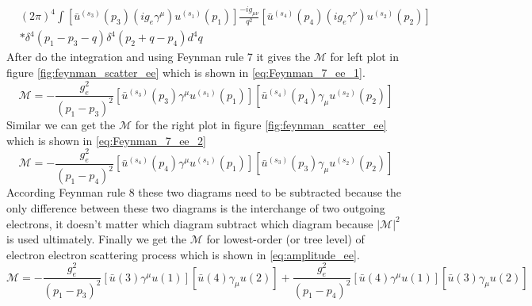 \begin{equation}
\begin{split}
&(2\pi)^{4}\int[\bar{u}^{(s_{3})}(p_{3})(ig_{e}\gamma^{\mu})u^{(s_{1})}(p_{1})]\frac{-ig_{\mu\nu}}{q^{2}}[\bar{u}^{(s_{4})}(p_{4})(ig_{e}\gamma^{\nu})u^{(s_{2})}(p_{2})] \\
&*\delta^{4}(p_{1}-p_{3}-q)\delta^{4}(p_{2}+q-p_{4})d^{4}q
\end{split}
\label{eq:Feynman_1_6_ee_1}
\end{equation}
After do the integration and using Feynman rule 7 it gives the $\mathcal{M}$ for left plot in figure \ref{fig:feynman_scatter_ee} which is shown in \ref{eq:Feynman_7_ee_1}.
\begin{equation}
\mathcal{M}=-\frac{g_{e}^{2}}{(p_{1}-p_{3})^{2}}[\bar{u}^{(s_{3})}(p_{3})\gamma^{\mu}u^{(s_{1})}(p_{1})][\bar{u}^{(s_{4})}(p_{4})\gamma_{\mu}u^{(s_{2})}(p_{2})]
\label{eq:Feynman_7_ee_1}
\end{equation}
Similar we can get the $\mathcal{M}$ for the right plot in figure \ref{fig:feynman_scatter_ee} which is shown in \ref{eq:Feynman_7_ee_2}
\begin{equation}
\mathcal{M}=-\frac{g_{e}^{2}}{(p_{1}-p_{4})^{2}}[\bar{u}^{(s_{4})}(p_{4})\gamma^{\mu}u^{(s_{1})}(p_{1})][\bar{u}^{(s_{3})}(p_{3})\gamma_{\mu}u^{(s_{2})}(p_{2})]
\label{eq:Feynman_7_ee_2}
\end{equation}
According Feynman rule 8 these two diagrams need to be subtracted because the only difference between these two diagrams is the interchange of two outgoing electrons, it doesn't matter which diagram subtract which diagram because $|\mathcal{M}|^{2}$ is used ultimately. Finally we get the $\mathcal{M}$ for lowest-order (or tree level) of electron electron scattering process which is shown in \ref{eq:amplitude_ee}.
\begin{equation}
\mathcal{M}=-\frac{g_{e}^{2}}{(p_{1}-p_{3})^{2}}[\bar{u}(3)\gamma^{\mu}u(1)][\bar{u}(4)\gamma_{\mu}u(2)]+\frac{g_{e}^{2}}{(p_{1}-p_{4})^{2}}[\bar{u}(4)\gamma^{\mu}u(1)][\bar{u}(3)\gamma_{\mu}u(2)]
\label{eq:amplitude_ee}
\end{equation}

